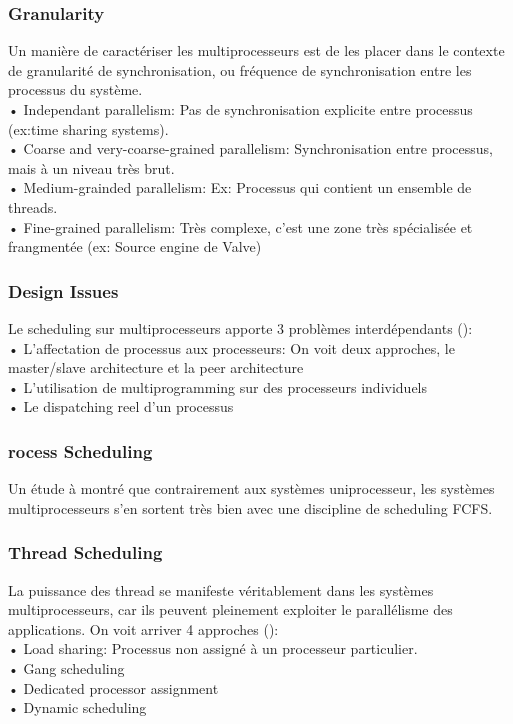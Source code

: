 \subsubsection{Granularity}
Un manière de caractériser les multiprocesseurs est de les placer dans le contexte de granularité de synchronisation, ou fréquence de synchronisation entre les processus du système. \\
• Independant parallelism: Pas de synchronisation explicite entre processus (ex:time sharing systems). \\
• Coarse and very-coarse-grained parallelism: Synchronisation entre processus, mais à un niveau très brut. \\
• Medium-grainded parallelism: Ex: Processus qui contient un ensemble de threads.\\
• Fine-grained parallelism: Très complexe, c'est une zone très spécialisée et frangmentée (ex: Source engine de Valve)
\subsubsection{Design Issues}
Le scheduling sur multiprocesseurs apporte 3 problèmes interdépendants (\cite[p.~434-435]{stallings}):\\
• L'affectation de processus aux processeurs: On voit deux approches, le master/slave architecture et la peer architecture\\
• L'utilisation de multiprogramming sur des processeurs individuels\\
• Le dispatching reel d'un processus
\subsubsection{rocess Scheduling}
Un étude à montré que contrairement aux systèmes uniprocesseur, les systèmes multiprocesseurs s'en sortent très bien avec une discipline de scheduling FCFS.
\subsubsection{Thread Scheduling}
La puissance des thread se manifeste véritablement dans les systèmes multiprocesseurs, car ils peuvent pleinement exploiter le parallélisme des applications. On voit arriver 4 approches (\cite[p.~437-442]{stallings}):\\
• Load sharing: Processus non assigné à un processeur particulier. \\
• Gang scheduling\\
• Dedicated processor assignment\\
• Dynamic scheduling
